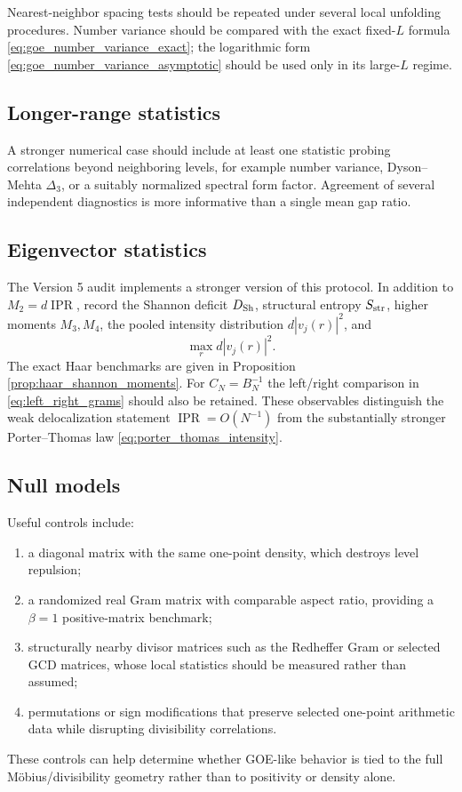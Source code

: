 \documentclass[11pt]{amsart}
\numberwithin{equation}{section}
\theoremstyle{plain}
\theoremstyle{definition}
\theoremstyle{remark}
\newcommand{\IPR}{\operatorname{IPR}}
\begin{document}
Nearest-neighbor spacing tests should be repeated under several local unfolding procedures.  Number variance should be compared with the exact fixed-$L$ formula \eqref{eq:goe_number_variance_exact}; the logarithmic form \eqref{eq:goe_number_variance_asymptotic} should be used only in its large-$L$ regime.

\subsection{Longer-range statistics}
\label{subsec:long_range_protocol}

A stronger numerical case should include at least one statistic probing correlations beyond neighboring levels, for example number variance, Dyson--Mehta $\Delta_3$, or a suitably normalized spectral form factor.  Agreement of several independent diagnostics is more informative than a single mean gap ratio.

\subsection{Eigenvector statistics}
\label{subsec:eigenvector_protocol}

The Version 5 audit implements a stronger version of this protocol.  In addition to $M_2=d\IPR$, record the Shannon deficit $D_{\rm Sh}$, structural entropy $S_{\rm str}$, higher moments $M_3,M_4$, the pooled intensity distribution $d|v_j(r)|^2$, and
\begin{equation}
\max_r d|v_j(r)|^2.
\label{eq:eigenvector_sup_norm}
\end{equation}
The exact Haar benchmarks are given in Proposition \ref{prop:haar_shannon_moments}.  For $C_N=B_N^{-1}$ the left/right comparison in \eqref{eq:left_right_grams} should also be retained.  These observables distinguish the weak delocalization statement $\IPR=O(N^{-1})$ from the substantially stronger Porter--Thomas law \eqref{eq:porter_thomas_intensity}.

\subsection{Null models}
\label{subsec:null_models}

Useful controls include:
\begin{enumerate}[label=(\roman*)]
\item a diagonal matrix with the same one-point density, which destroys level repulsion;
\item a randomized real Gram matrix with comparable aspect ratio, providing a $\beta=1$ positive-matrix benchmark;
\item structurally nearby divisor matrices such as the Redheffer Gram or selected GCD matrices, whose local statistics should be measured rather than assumed;
\item permutations or sign modifications that preserve selected one-point arithmetic data while disrupting divisibility correlations.
\end{enumerate}
These controls can help determine whether GOE-like behavior is tied to the full M\"obius/divisibility geometry rather than to positivity or density alone.
\end{document}
